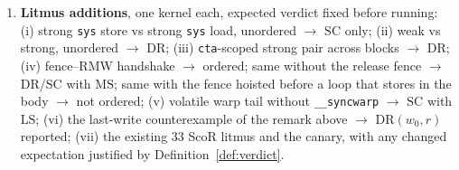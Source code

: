 \documentclass[11pt]{article}
\theoremstyle{remark}
\newcommand{\DR}{\mathrm{DR}}
\newcommand{\SC}{\mathrm{SC}}
\newcommand{\LS}{\mathrm{LS}}
\newcommand{\MS}{\mathrm{MS}}
\begin{document}
\begin{enumerate}[label=O\arabic*.,nosep]
      issue group per record (for $\LS$). Monitor checks: uniform size per
      location (Assumption~\ref{as:size}); sync-location condition
      (Assumption~\ref{as:sync}) with the conservative reaction.
\item \textbf{Litmus additions}, one kernel each, expected verdict fixed
      before running: (i) strong \texttt{sys} store vs strong \texttt{sys}
      load, unordered $\to$ $\SC$ only; (ii) weak vs strong, unordered
      $\to$ $\DR$; (iii) \texttt{cta}-scoped strong pair across blocks $\to$
      $\DR$; (iv) fence--RMW handshake $\to$ ordered; same without the release
      fence $\to$ $\DR$/$\SC$ with $\MS$; same with the fence hoisted before a
      loop that stores in the body $\to$ not ordered; (v) volatile warp tail
      without \texttt{\_\_syncwarp} $\to$ $\SC$ with $\LS$; (vi) the
      last-write counterexample of the remark above $\to$ $\DR(w_0,r)$
      reported; (vii) the existing 33 ScoR litmus and the canary, with any
      changed expectation justified by Definition~\ref{def:verdict}.
\end{enumerate}
\end{document}

